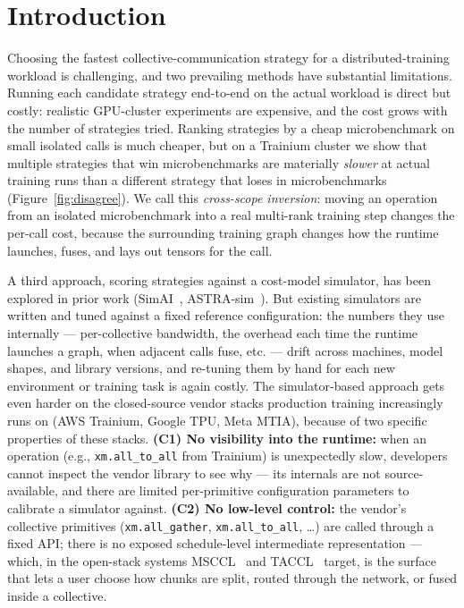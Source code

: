 \section{Introduction}
\label{sec:intro}

Choosing the fastest collective-communication strategy for a
distributed-training workload is challenging, and
two prevailing methods have substantial limitations. Running each
candidate strategy end-to-end on the actual workload is direct
but costly: realistic GPU-cluster experiments are expensive,
and the cost grows with the number of strategies tried.
Ranking strategies by a cheap microbenchmark on small
isolated calls is much cheaper, but on a Trainium cluster we
show that multiple strategies that win microbenchmarks are
materially \emph{slower} at actual training runs than a
different strategy that loses in microbenchmarks
(Figure~\ref{fig:disagree}). We call this \emph{cross-scope
inversion}: moving an operation from an isolated microbenchmark
into a real multi-rank training step changes the per-call cost,
because the surrounding training graph changes how the runtime
launches, fuses, and lays out tensors for the call.

A third approach, scoring strategies against a cost-model
simulator, has been explored in prior work
(SimAI~\cite{wang2025simai},
ASTRA-sim~\cite{rashidi2020astrasim,won2023astrasim2}). But
existing simulators are written and tuned against a fixed
reference configuration: the numbers they use internally ---
per-collective bandwidth, the overhead each time the runtime
launches a graph, when adjacent calls fuse, etc. --- drift
across machines, model shapes, and library versions,
and re-tuning them by hand for each new environment
or training task is again costly. The
simulator-based approach gets even harder on the closed-source
vendor stacks production training increasingly runs on (AWS
Trainium, Google TPU, Meta MTIA), because of two specific
properties of these stacks.
\textbf{(C1) No visibility into the runtime:} when an operation
(e.g., \texttt{xm.all\_to\_all} from Trainium) is unexpectedly slow, developers
cannot inspect the vendor library to see why --- its internals are
not source-available, and there are limited per-primitive 
configuration parameters to calibrate a simulator against.
\textbf{(C2) No low-level control:} the vendor's collective
primitives (\texttt{xm.all\_gather}, \texttt{xm.all\_to\_all},
\dots) are called through a fixed API; there is no exposed
schedule-level intermediate representation
--- which, in the open-stack systems
MSCCL~\cite{cowan2022msccl} and
TACCL~\cite{shah2023taccl} target, is the surface that lets a
user choose how chunks are split, routed through the network,
or fused inside a collective.

